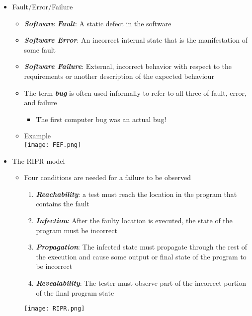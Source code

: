 \begin{itemize}
	\item Fault/Error/Failure
	\begin{itemize}
		\item \textbf{\textit{Software Fault}}: A static defect in the software
		\item \textbf{\textit{Software Error}}: An incorrect internal state that is the manifestation of
		some fault
		\item \textbf{\textit{Software Failure}}: External, incorrect behavior with respect to the requirements or another description of the expected behaviour
		\item The term \textbf{\textit{bug }}is often used informally to refer to all three of fault, error, and failure
		\begin{itemize}
			\item The first computer bug was an actual bug!
		\end{itemize}
		\item Example\\
		\texttt{[image: FEF.png]}
	\end{itemize}

	\newpage
	\item The RIPR model
	\begin{itemize}
		\item Four conditions are needed for a failure to be observed
		\begin{enumerate}
			\item \textbf{\textit{Reachability}}: a test must reach the location in the program that contains the fault
			\item \textbf{\textit{Infection}}: After the faulty location is executed, the state of the program must be incorrect
			\item \textbf{\textit{Propagation}}: The infected state must propagate through the rest of the execution and cause some output or final state of the program to be incorrect
			\item \textbf{\textit{Revealability}}: The tester must observe part of the incorrect portion of the final program state
		\end{enumerate}
		\texttt{[image: RIPR.png]}
	\end{itemize}


\end{itemize}
